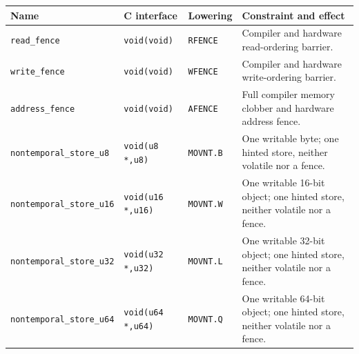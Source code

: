 \begingroup\footnotesize
\setlength{\tabcolsep}{2pt}
\begin{longtable}{@{}p{1.35in}p{1.3in}p{0.75in}p{2.2in}@{}}
\toprule
\textbf{Name} & \textbf{C interface} & \textbf{Lowering} & \textbf{Constraint and effect}\\
\midrule
\endhead
\texttt{read\_fence} & \texttt{void(void)} & \texttt{RFENCE} & Compiler and hardware read-ordering barrier.\\
\texttt{write\_fence} & \texttt{void(void)} & \texttt{WFENCE} & Compiler and hardware write-ordering barrier.\\
\texttt{address\_fence} & \texttt{void(void)} & \texttt{AFENCE} & Full compiler memory clobber and hardware address fence.\\
\texttt{nontemporal\_store\_u8} & \texttt{void(u8 *,u8)} & \texttt{MOVNT.B} & One writable byte; one hinted store, neither volatile nor a fence.\\
\texttt{nontemporal\_store\_u16} & \texttt{void(u16 *,u16)} & \texttt{MOVNT.W} & One writable 16-bit object; one hinted store, neither volatile nor a fence.\\
\texttt{nontemporal\_store\_u32} & \texttt{void(u32 *,u32)} & \texttt{MOVNT.L} & One writable 32-bit object; one hinted store, neither volatile nor a fence.\\
\texttt{nontemporal\_store\_u64} & \texttt{void(u64 *,u64)} & \texttt{MOVNT.Q} & One writable 64-bit object; one hinted store, neither volatile nor a fence.\\
\bottomrule
\end{longtable}
\endgroup
